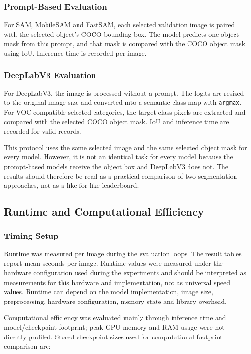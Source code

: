 \documentclass[9pt,a4paper,oneside]{rho-class/rho}
\begin{document}
\subsubsection{Prompt-Based Evaluation}

    For SAM, MobileSAM and FastSAM, each selected validation image is paired with the selected object's COCO bounding box. The model predicts one object mask from this prompt, and that mask is compared with the COCO object mask using IoU. Inference time is recorded per image.

\subsubsection{DeepLabV3 Evaluation}

    For DeepLabV3, the image is processed without a prompt. The logits are resized to the original image size and converted into a semantic class map with \texttt{argmax}. For VOC-compatible selected categories, the target-class pixels are extracted and compared with the selected COCO object mask. IoU and inference time are recorded for valid records.

    This protocol uses the same selected image and the same selected object mask for every model. However, it is not an identical task for every model because the prompt-based models receive the object box and DeepLabV3 does not. The results should therefore be read as a practical comparison of two segmentation approaches, not as a like-for-like leaderboard.

\subsection{Runtime and Computational Efficiency}

\subsubsection{Timing Setup}

    Runtime was measured per image during the evaluation loops. The result tables report mean seconds per image. Runtime values were measured under the hardware configuration used during the experiments and should be interpreted as measurements for this hardware and implementation, not as universal speed values. Runtime can depend on the model implementation, image size, preprocessing, hardware configuration, memory state and library overhead.

    Computational efficiency was evaluated mainly through inference time and model/checkpoint footprint; peak GPU memory and RAM usage were not directly profiled. Stored checkpoint sizes used for computational footprint comparison are:
\end{document}
